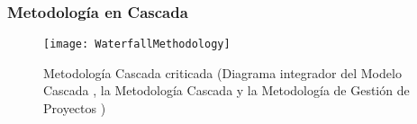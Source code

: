 \subsubsection{Metodología en Cascada}

\begin{figure}[h]
  \centering
  \texttt{[image: WaterfallMethodology]}
  \caption{Metodología Cascada criticada (Diagrama integrador del Modelo Cascada \cite{Winston-Royce-1970}, la Metodología Cascada \cite{Ken-Schwaber-1995} y la Metodología de Gestión de Proyectos \cite{PMBOK-1996})}
  \centering
  \label{fig:WaterfallMethodology} %
\end{figure}
